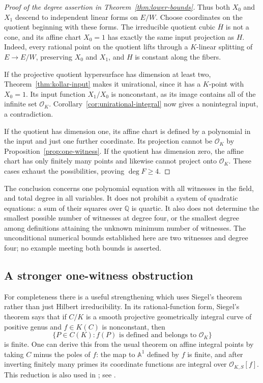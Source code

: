 \begin{proof}[Proof of the degree assertion in Theorem~\ref{thm:lower-bounds}]
Thus both $X_0$ and $X_1$ descend to independent linear forms on $E/W$.
Choose coordinates on the quotient beginning with these forms.  The
irreducible quotient cubic $\overline H$ is not a cone, and its affine
chart $X_0=1$ has exactly the same input projection as $H$.
Indeed, every rational point on the quotient lifts through a $K$-linear
splitting of $E\to E/W$, preserving $X_0$ and $X_1$, and $H$ is constant
along the fibers.

If the projective quotient hypersurface has dimension at least two,
Theorem~\ref{thm:kollar-input} makes it unirational, since it has a
$K$-point with $X_0=1$.  Its input function $X_1/X_0$ is nonconstant,
as its image contains all of the infinite set $\mathcal O_K$.
Corollary~\ref{cor:unirational-integral} now gives a nonintegral input,
a contradiction.

If the quotient has dimension one, its affine chart is defined by a
polynomial in the input and just one further coordinate.  Its projection
cannot be $\mathcal O_K$ by Proposition~\ref{prop:one-witness}.
If the quotient has dimension zero, the affine chart has only finitely
many points and likewise cannot project onto $\mathcal O_K$.
These cases exhaust the possibilities, proving $\deg F\ge4$.
\end{proof}

\begin{remark}
The conclusion concerns one polynomial equation with all witnesses in the
field, and total degree in all variables.  It does not prohibit a system
of quadratic equations: a sum of their squares over $\mathbb Q$ is quartic.
It also does not determine the smallest possible number of witnesses at
degree four, or the smallest degree among definitions attaining the
unknown minimum number of witnesses.  The unconditional numerical
bounds established here are two witnesses and degree four; no example
meeting both bounds is asserted.
\end{remark}

\subsection{A stronger one-witness obstruction}

For completeness there is a useful strengthening which uses Siegel's
theorem rather than just Hilbert irreducibility.
In its rational-function form, Siegel's theorem says that if $C/K$ is a
smooth projective geometrically integral curve of positive genus and
$f\in K(C)$ is nonconstant, then
\[
              \{P\in C(K):f(P)\text{ is defined and belongs to }
                       \mathcal O_K\}
\]
is finite.  One can derive this from the usual theorem on affine integral
points by taking $C$ minus the poles of $f$: the map to $\mathbb A^1$
defined by $f$ is finite, and after inverting finitely many primes its
coordinate functions are integral over $\mathcal O_{K,S}[f]$.
This reduction is also used in
\cite[Section~2.1]{lbMuller2001}; see \cite[Chapter~8]{lbLang1983}.

